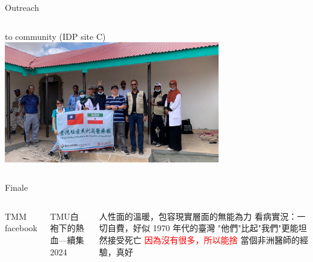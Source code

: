 \documentclass[aspectratio=169]{beamer}
\begin{document}
\begin{frame}{Outreach}
    \begin{columns}
    to community (IDP site C)
    \includegraphics[width=0.7\textwidth]{IMG_1713.jpeg}
    \end{columns}  
\end{frame}


\begin{frame}{Finale}
\begin{columns}
    
TMM facebook

TMU白袍下的熱血---續集2024
\begin{outline}


    \1 人性面的溫暖，包容現實層面的無能為力
        \2 看病實況：一切自費，好似 1970 年代的臺灣
        \2 "他們"比起"我們"更能坦然接受死亡
        \2 \textcolor{red}{因為沒有很多，所以能捨}
    \1 當個非洲醫師的經驗，真好

\end{outline}


\end{columns}
\end{frame}


\end{document}
